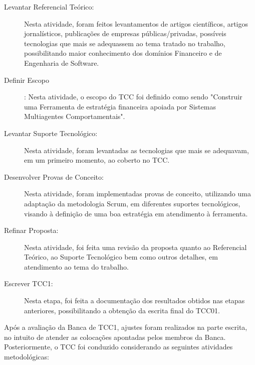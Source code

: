 \begin{description}
\item [Levantar Referencial Teórico:] Nesta atividade, foram feitos levantamentos de artigos científicos, artigos jornalísticos, publicações de empresas públicas/privadas, possíveis tecnologias que mais se adequassem ao tema tratado no trabalho, possibilitando maior conhecimento dos domínios Financeiro e de Engenharia de Software.

\item [Definir Escopo]:
Nesta atividade, o escopo do TCC foi definido como sendo "Construir uma Ferramenta de estratégia financeira apoiada por Sistemas Multiagentes Comportamentais".

\item [Levantar Suporte Tecnológico:] 
 Nesta atividade, foram levantadas as tecnologias que mais se adequavam, em um primeiro momento, ao coberto no TCC.

\item [Desenvolver Provas de Conceito:]
Nesta atividade, foram implementadas provas de conceito, utilizando uma adaptação da metodologia Scrum, em diferentes suportes tecnológicos, visando à definição de uma boa estratégia em atendimento à ferramenta.

\item [Refinar Proposta:] 
Nesta atividade, foi feita uma revisão da proposta quanto ao Referencial Teórico, ao Suporte Tecnológico bem como outros detalhes, em atendimento ao tema do trabalho.

\item [Escrever TCC1:]
Nesta etapa, foi feita a documentação dos resultados obtidos nas etapas anteriores, possibilitando a obtenção da escrita final do TCC01.
\end{description}

Após a avaliação da Banca de TCC1, ajustes foram realizados na parte escrita, no intuito de atender as colocações apontadas pelos membros da Banca. Posteriormente, o TCC foi conduzido considerando as seguintes atividades metodológicas:

